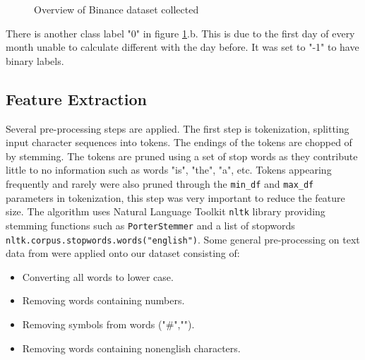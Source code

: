 \documentclass[transmag]{IEEEtran}
\begin{document}
\begin{figure}[h!]
    \centering
    \caption{Overview of Binance dataset collected}%
    \label{fig:binance_overview}%
\end{figure}

There is another class label "0" in figure \ref{fig:binance_overview}.b. This is due to the first day of every month unable to calculate different with the day before. It was set to "-1" to have binary labels.

\subsection{Feature Extraction}

Several pre-processing steps are applied. The first step is tokenization, splitting input character sequences into tokens. The endings of the tokens are chopped of by stemming. The tokens are pruned using a set of stop words as they contribute little to no information such as words "is", "the", "a", etc. Tokens appearing frequently and rarely were also pruned through the \verb|min_df| and \verb|max_df| parameters in tokenization, this step was very important to reduce the feature size. The algorithm uses Natural Language Toolkit \verb|nltk| library providing stemming functions such as \verb|PorterStemmer| and a list of stopwords \verb|nltk.corpus.stopwords.words("english")|. Some general pre-processing on text data from \cite{sattarov2020forecasting} were applied onto our dataset consisting of:
\begin{itemize}
  \item Converting all words to lower case.
  \item Removing words containing numbers.
  \item Removing symbols from words ("\#","\@@").
  \item Removing words containing non\-english characters.
\end{itemize}
\end{document}
